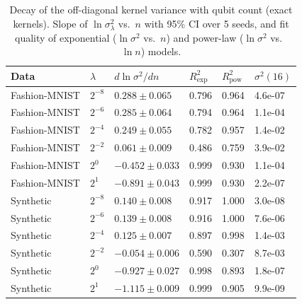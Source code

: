 \begin{table}[t]
\centering
\caption{Decay of the off-diagonal kernel variance with qubit count (exact kernels). Slope of $\ln\sigma^2_\lambda$ vs.\ $n$ with 95\% CI over 5 seeds, and fit quality of exponential ($\ln\sigma^2$ vs.\ $n$) and power-law ($\ln\sigma^2$ vs.\ $\ln n$) models.}
\label{tab:decay}
\setlength{\tabcolsep}{3pt}
\begin{tabular}{llllll}
\toprule
Data & $\lambda$ & $d\ln\sigma^2/dn$ & $R^2_{\exp}$ & $R^2_{\mathrm{pow}}$ & $\sigma^2(16)$ \\
\midrule
Fashion-MNIST & $2^{-8}$ & $0.288\pm0.065$ & 0.796 & 0.964 & 4.6e-07 \\
Fashion-MNIST & $2^{-6}$ & $0.285\pm0.064$ & 0.794 & 0.964 & 1.1e-04 \\
Fashion-MNIST & $2^{-4}$ & $0.249\pm0.055$ & 0.782 & 0.957 & 1.4e-02 \\
Fashion-MNIST & $2^{-2}$ & $0.061\pm0.009$ & 0.486 & 0.759 & 3.9e-02 \\
Fashion-MNIST & $2^{0}$ & $-0.452\pm0.033$ & 0.999 & 0.930 & 1.1e-04 \\
Fashion-MNIST & $2^{1}$ & $-0.891\pm0.043$ & 0.999 & 0.930 & 2.2e-07 \\
Synthetic & $2^{-8}$ & $0.140\pm0.008$ & 0.917 & 1.000 & 3.0e-08 \\
Synthetic & $2^{-6}$ & $0.139\pm0.008$ & 0.916 & 1.000 & 7.6e-06 \\
Synthetic & $2^{-4}$ & $0.125\pm0.007$ & 0.897 & 0.998 & 1.4e-03 \\
Synthetic & $2^{-2}$ & $-0.054\pm0.006$ & 0.590 & 0.307 & 8.7e-03 \\
Synthetic & $2^{0}$ & $-0.927\pm0.027$ & 0.998 & 0.893 & 1.8e-07 \\
Synthetic & $2^{1}$ & $-1.115\pm0.009$ & 0.999 & 0.905 & 9.9e-09 \\
\bottomrule
\end{tabular}
\end{table}
